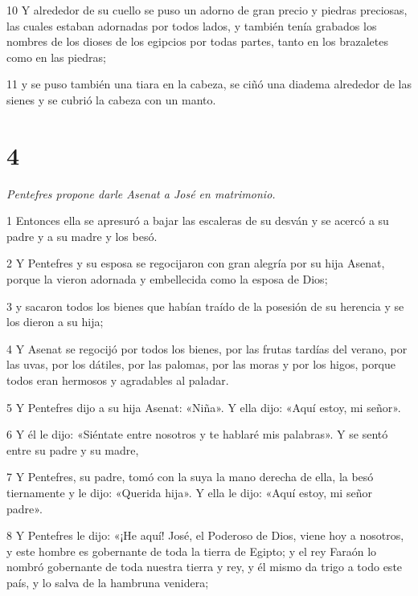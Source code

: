 \par 10 Y alrededor de su cuello se puso un adorno de gran precio y piedras preciosas, las cuales estaban adornadas por todos lados, y también tenía grabados los nombres de los dioses de los egipcios por todas partes, tanto en los brazaletes como en las piedras;

\par 11 y se puso también una tiara en la cabeza, se ciñó una diadema alrededor de las sienes y se cubrió la cabeza con un manto.

\chapter{4}

\textit{Pentefres propone darle Asenat a José en matrimonio.}

\par 1 Entonces ella se apresuró a bajar las escaleras de su desván y se acercó a su padre y a su madre y los besó.

\par 2 Y Pentefres y su esposa se regocijaron con gran alegría por su hija Asenat, porque la vieron adornada y embellecida como la esposa de Dios;

\par 3 y sacaron todos los bienes que habían traído de la posesión de su herencia y se los dieron a su hija;

\par 4 Y Asenat se regocijó por todos los bienes, por las frutas tardías del verano, por las uvas, por los dátiles, por las palomas, por las moras y por los higos, porque todos eran hermosos y agradables al paladar.

\par 5 Y Pentefres dijo a su hija Asenat: «Niña». Y ella dijo: «Aquí estoy, mi señor».

\par 6 Y él le dijo: «Siéntate entre nosotros y te hablaré mis palabras». Y se sentó entre su padre y su madre,

\par 7 Y Pentefres, su padre, tomó con la suya la mano derecha de ella, la besó tiernamente y le dijo: «Querida hija». Y ella le dijo: «Aquí estoy, mi señor padre».

\par 8 Y Pentefres le dijo: «¡He aquí! José, el Poderoso de Dios, viene hoy a nosotros, y este hombre es gobernante de toda la tierra de Egipto; y el rey Faraón lo nombró gobernante de toda nuestra tierra y rey, y él mismo da trigo a todo este país, y lo salva de la hambruna venidera;

